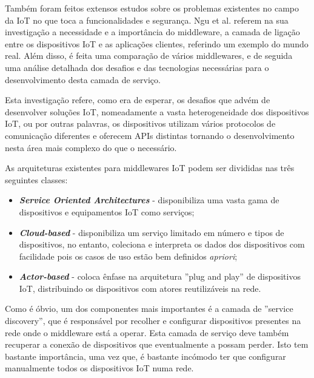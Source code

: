 
Também foram feitos extensos estudos sobre os problemas existentes no campo da IoT no que toca a funcionalidades e segurança. Ngu et al. referem na sua investigação \cite{iot-survey-issues}a necessidade e a importância do middleware, a camada de ligação entre os dispositivos IoT e as aplicações clientes, referindo um exemplo do mundo real. Além disso, é feita uma comparação de vários middlewares, e de seguida uma análise detalhada dos desafios e das tecnologias necessárias para o desenvolvimento desta camada de serviço.

Esta investigação refere, como era de esperar, os desafios que advém de desenvolver soluções IoT, nomeadamente a vasta heterogeneidade dos dispositivos IoT, ou por outras palavras, os dispositivos utilizam vários protocolos de comunicação diferentes e oferecem APIs distintas tornando o desenvolvimento nesta área mais complexo do que o necessário.

As arquiteturas existentes para middlewares IoT podem ser divididas nas três seguintes classes:
\begin{itemize}
\item \textbf{\textit{Service Oriented Architectures}} - disponibiliza uma vasta gama de dispositivos e equipamentos IoT como serviços;
\item \textbf{\textit{Cloud-based}} - disponibiliza um serviço limitado em número e tipos de dispositivos, no entanto, coleciona e interpreta os dados dos dispositivos com facilidade pois os casos de uso estão bem definidos \textit{apriori};
\item \textbf{\textit{Actor-based}} - coloca ênfase na arquitetura ''plug and play''  de dispositivos IoT, distribuindo os dispositivos com atores reutilizáveis na rede.
\end{itemize}

Como é óbvio, um dos componentes mais importantes é a camada de ''service discovery'', que é responsável por recolher e configurar dispositivos presentes na rede onde o middleware está a operar. Esta camada de serviço deve também recuperar a conexão de dispositivos que eventualmente a possam perder. Isto tem bastante importância, uma vez que, é bastante incómodo ter que configurar manualmente todos os dispositivos IoT numa rede.

